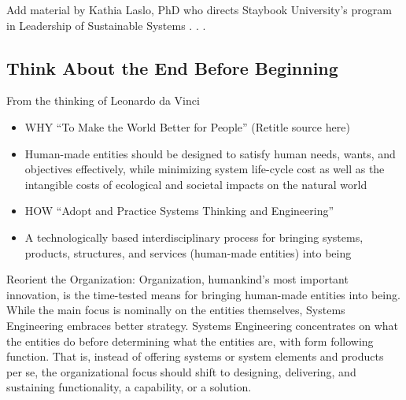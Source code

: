 	Add material by Kathia Laslo, PhD who directs Staybook University’s program in Leadership of Sustainable Systems . . . 
    
\subsection{Think About the End Before Beginning}

From the thinking of Leonardo da Vinci
\begin{itemize}
\item WHY “To Make the World Better for People” (Retitle source here)
\item Human-made entities should be designed to satisfy human needs, wants, and objectives effectively, while minimizing system life-cycle cost as well as the intangible costs of ecological and societal impacts on the natural world
\item HOW ``Adopt and Practice Systems Thinking and Engineering''
\item A technologically based interdisciplinary process for bringing systems, products, structures, and services (human-made entities) into being
\end{itemize}

Reorient the Organization: Organization, humankind’s most important innovation, is the time-tested means for bringing human-made entities into being. While the main focus is nominally on the entities themselves, Systems Engineering embraces better strategy. Systems Engineering concentrates on what the entities do before determining what the entities are, with form following function. That is, instead of offering systems or system elements and products per se, the organizational focus should shift to designing, delivering, and sustaining functionality, a capability, or a solution.